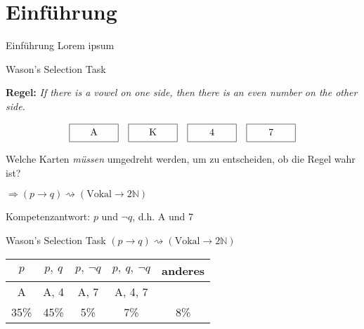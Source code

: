 
{
    \section{Einführung}
}

\begin{frame}{Einführung}
    Lorem ipsum
\end{frame}


\begin{frame}{Wason's Selection Task {\scriptsize \cite[S.~44-46]{stenningHumanReasoningCognitive2008}}}

    \textbf{Regel:} \emph{If there is a vowel on one side, then there is an even number on the other side.}

    \[
        \framebox[5em][c]{A\strut}\quad
        \framebox[5em][c]{K\strut}\quad
        \framebox[5em][c]{4\strut}\quad
        \framebox[5em][c]{7\strut}
    \]

    Welche Karten \emph{müssen} umgedreht werden, um zu entscheiden, ob die Regel wahr ist?

    $\Rightarrow (p \to q) \rightsquigarrow (\text{Vokal} \to 2\mathbb{N})$

    Kompetenzantwort: $p$ und $\lnot q$, d.h. A und 7
\end{frame}

\begin{frame}{Wason's Selection Task {\scriptsize \cite[S.~44-46]{stenningHumanReasoningCognitive2008}}}
    $(p \to q) \rightsquigarrow (\text{Vokal} \to 2\mathbb{N})$

    \begin{center}
        \begin{tabular}{c | c | c | c | c}
            $p$ &$p,~q$ &\alert{$p, ~\lnot q$} &$p, ~q, ~\lnot q$ &anderes \\
            \hline
            A &A, 4 &\alert{A, 7} &A, 4, 7 & \\
            \hline \hline
            35\% &45\% &\alert{5\%} &7\% &8\%
        \end{tabular}
    \end{center}
\end{frame}


